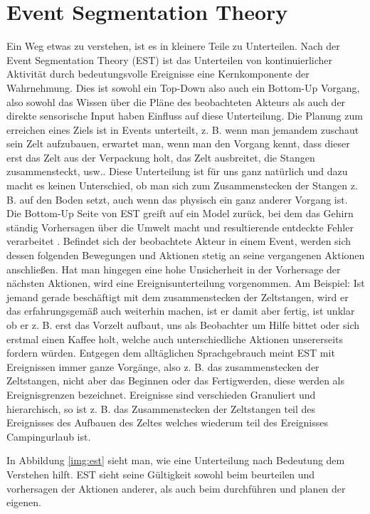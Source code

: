 \section{Event Segmentation Theory}
Ein Weg etwas zu verstehen, ist es in kleinere Teile zu Unterteilen. Nach der Event Segmentation Theory (EST) \cite{bib:est1} ist das Unterteilen von kontinuierlicher Aktivität durch bedeutungsvolle Ereignisse eine Kernkomponente der Wahrnehmung.  Dies ist sowohl ein Top-Down also auch ein Bottom-Up Vorgang, also sowohl das Wissen über die Pläne des beobachteten Akteurs als auch der direkte sensorische Input haben Einfluss auf diese Unterteilung.\cite{bib:est} Die Planung zum erreichen eines Ziels ist in Events unterteilt, z. B. wenn man jemandem zuschaut sein Zelt aufzubauen, erwartet man, wenn man den Vorgang kennt, dass dieser erst das Zelt aus der Verpackung holt, das Zelt ausbreitet, die Stangen zusammensteckt, usw.. Diese Unterteilung ist für uns ganz natürlich und dazu macht es keinen Unterschied, ob man sich zum Zusammenstecken der Stangen z. B. auf den Boden setzt, auch wenn das physisch ein ganz anderer Vorgang ist. Die Bottom-Up Seite von EST greift auf ein Model zurück, bei dem das Gehirn ständig Vorhersagen über die Umwelt macht und resultierende entdeckte Fehler verarbeitet \cite{bib:est}. Befindet sich der beobachtete Akteur in einem Event, werden sich dessen folgenden Bewegungen und Aktionen stetig an seine vergangenen Aktionen anschließen. Hat man hingegen eine hohe Unsicherheit in der Vorhersage der nächsten Aktionen, wird eine Ereignisunterteilung vorgenommen. Am Beispiel: Ist jemand gerade beschäftigt mit dem zusammenstecken der Zeltstangen, wird er das erfahrungsgemäß auch weiterhin machen, ist er damit aber fertig, ist unklar ob er z. B. erst das Vorzelt aufbaut, uns als Beobachter um Hilfe bittet oder sich erstmal einen Kaffee holt, welche auch unterschiedliche Aktionen unsererseits fordern würden.
Entgegen dem alltäglichen Sprachgebrauch meint EST mit Ereignissen immer ganze Vorgänge, also z. B. das zusammenstecken der Zeltstangen, nicht aber das Beginnen oder das Fertigwerden, diese werden als Ereignisgrenzen bezeichnet. Ereignisse sind verschieden Granuliert und hierarchisch, so ist z. B. das Zusammenstecken der Zeltstangen teil des Ereignisses des Aufbauen des Zeltes welches wiederum teil des Ereignisses Campingurlaub ist.

In Abbildung \ref{img:est} sieht man, wie eine Unterteilung nach Bedeutung dem Verstehen hilft. EST sieht seine Gültigkeit sowohl beim beurteilen und vorhersagen der Aktionen anderer, als auch beim durchführen und planen der eigenen.


